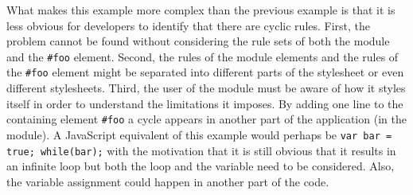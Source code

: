 \documentclass[a4paper,11pt]{kth-mag}
\newcommand{\code}[1]{\texttt{#1}}
\begin{document}
        What makes this example more complex than the previous example is that it is less obvious for developers to identify that there are cyclic rules.
        First, the problem cannot be found without considering the rule sets of both the module and the \code{\#foo} \gls{element}.
        Second, the rules of the module \glspl{element} and the rules of the \code{\#foo} \gls{element} might be separated into different parts of the stylesheet or even different stylesheets.
        Third, the user of the module must be aware of how it styles itself in order to understand the limitations it imposes.
        By adding one line to the containing element \code{\#foo} a cycle appears in another part of the application (in the module).
        A \gls{JavaScript} equivalent of this example would perhaps be \code{var bar = true; while(bar);} with the motivation that it is still obvious that it results in an infinite loop but both the loop and the variable need to be considered.
        Also, the variable assignment could happen in another part of the code.
\end{document}
